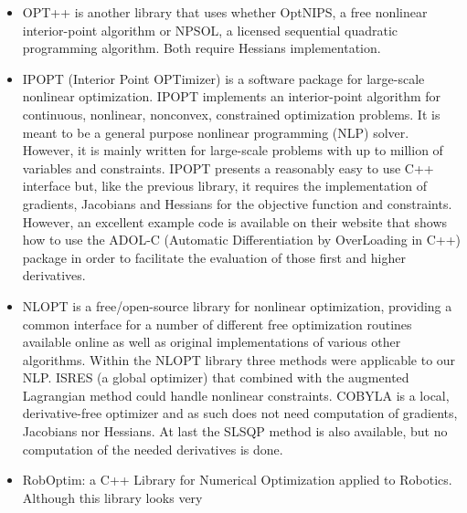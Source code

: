 \begin{itemize}

\item OPT++ is another library that uses whether OptNIPS, a free nonlinear interior-point algorithm or NPSOL, a licensed sequential quadratic programming algorithm. Both require Hessians implementation.

\item IPOPT (Interior Point OPTimizer) is a software package for large-scale nonlinear optimization. IPOPT implements an interior-point algorithm for continuous, nonlinear, nonconvex, constrained optimization problems. It is meant to be a general purpose nonlinear programming (NLP) solver. However, it is mainly written for large-scale problems with up to million of variables and constraints. IPOPT presents a reasonably easy to
use C++ interface but, like the previous library, it requires the implementation of gradients, Jacobians and Hessians for the objective function and constraints. However, an excellent example code is available on their website that shows how to use the ADOL-C (Automatic Differentiation by OverLoading in C++) package in order to facilitate the evaluation of those first and higher derivatives.

\item  NLOPT is a free/open-source library for nonlinear optimization, providing a common interface for a number of different free optimization routines available online as well as original implementations of various other algorithms. Within the NLOPT library three methods were applicable
to our NLP. ISRES (a global optimizer) that combined with the augmented Lagrangian method could handle nonlinear constraints. COBYLA is a local, derivative-free optimizer and as such does not need computation of gradients, Jacobians nor Hessians. At last the SLSQP method is also available, but no computation of the needed derivatives is done.

\item RobOptim: a C++ Library for Numerical Optimization applied to Robotics. Although this library looks very 

\end{itemize}


% 
%
%
%
% 


